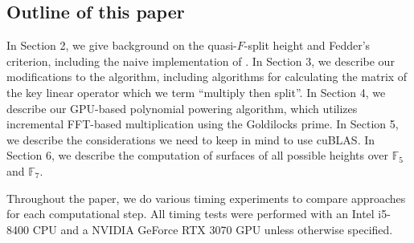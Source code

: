 
\subsection{Outline of this paper}


In Section 2, we give background on the quasi-\(F\)-split height
and Fedder's criterion, including the naive implementation
of \cite[Theorem~C]{kty-2022-fedder}.
In Section 3, we describe our modifications 
to the algorithm, including
algorithms for calculating the matrix
of the key linear operator which we term ``multiply then split''.
In Section 4, we describe our GPU-based polynomial
powering algorithm, which utilizes incremental FFT-based multiplication using  
the Goldilocks prime.
In Section 5, we describe the considerations we need to keep in mind
to use cuBLAS.
In Section 6, we describe the computation of surfaces of all possible
heights over \(\mathbb{F}_{5}\) and \(\mathbb{F}_{7}\).

Throughout the paper, we do various timing experiments to compare 
approaches for each computational step.
All timing tests were performed with 
an Intel i5-8400 CPU and a NVIDIA GeForce RTX 3070 GPU
unless otherwise specified.

